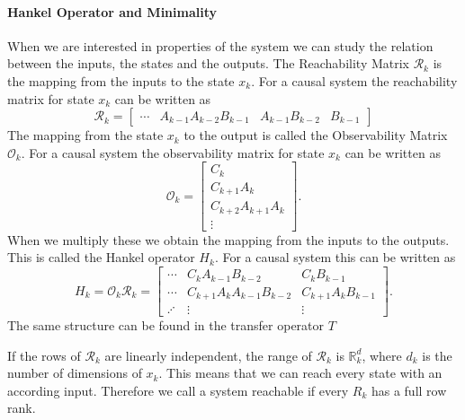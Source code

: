\documentclass[doctype=mastersthesis,BCOR=15mm,biblatex]{ldvbook}%
\newcommand{\R}{\mathcal{R}} %
\newcommand{\Ob}{\mathcal{O}} %
\begin{document}
\paragraph{Hankel Operator and Minimality}
When we are interested in properties of the system we can study the relation between the inputs, the states and the outputs. 
The Reachability Matrix $\R_k$ is the mapping from the inputs to the state $x_k$. For a causal system the reachability matrix for state $x_k$ can be written as
\begin{equation}
	\R_k = \begin{bmatrix}
	 \cdots & A_{k-1}A_{k-2}B_{k-1} &A_{k-1}B_{k-2} &B_{k-1}
	\end{bmatrix}
\end{equation}
The mapping from the state $x_k$ to the output is called the Observability Matrix $\Ob_k$.
For a causal system the observability matrix for state $x_k$ can be written as
\begin{equation}
	\Ob_k = 
	\begin{bmatrix}
		C_k\\
		C_{k+1}A_k\\
		C_{k+2}A_{k+1}A_k\\
		\vdots
	\end{bmatrix}.
\end{equation}
When we multiply these we obtain the mapping from the inputs to the outputs. This is called the Hankel operator $H_k$.
For a causal system this can be written as
\begin{equation}\label{eq:H_def}
	H_k = \Ob_k \R_k = 
		\begin{bmatrix}
\cdots   & C_{k}A_{k-1}B_{k-2} & C_{k}B_{k-1} \\
\cdots   & C_{k+1}A_{k}A_{k-1}B_{k-2} & C_{k+1}A_{k}B_{k-1} \\
\iddots &\vdots &\vdots
\end{bmatrix}
.
\end{equation}
The same structure can be found in the transfer operator $T$%
\vspace*{-0.7cm}

If the rows of $\R_k$ are linearly independent, the range of $\R_k$ is $\mathbb{R}^d_k$, where $d_k$ is the number of dimensions of $x_k$.
This means that we can reach every state with an according input.
Therefore we call a system reachable if every $R_k$ has a full row rank.
\end{document}
